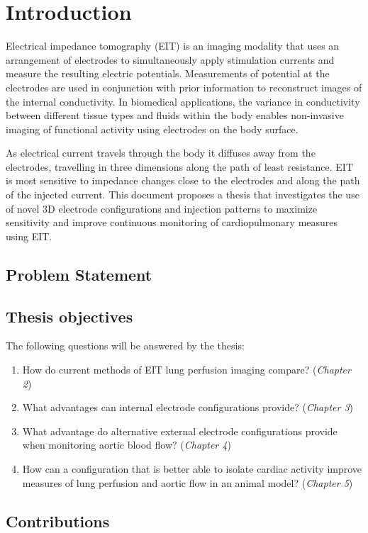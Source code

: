 \chapter{Introduction}

Electrical impedance tomography (EIT) is an imaging modality that uses an arrangement of electrodes to simultaneously apply 
stimulation currents and measure 
the resulting electric potentials. Measurements of potential at the electrodes are used in conjunction with 
prior information to reconstruct images 
of the internal conductivity. In biomedical applications, the variance in conductivity between different 
tissue types and fluids within the body enables non-invasive imaging of functional activity using electrodes on the 
body surface.

As electrical current travels through the body it diffuses away from the electrodes,
travelling in three dimensions along the path of least resistance. 
EIT is most sensitive to impedance changes close to the electrodes 
and along the path of the injected current.
This document proposes a thesis that investigates the use of novel 3D electrode 
configurations and injection patterns to maximize sensitivity and improve continuous monitoring 
of cardiopulmonary measures using EIT.

\section{Problem Statement}

\section{Thesis objectives}
The following questions will be answered by the thesis:
\begin{enumerate}
	\item How do current methods of EIT lung perfusion imaging compare? (\emph{Chapter 2})
	\item What advantages can internal electrode configurations provide? (\emph{Chapter 3})
\item What advantage do alternative external electrode configurations provide
	when monitoring aortic blood flow? (\emph{Chapter 4})
\item How can a configuration that is better able to isolate cardiac activity
	improve measures of lung perfusion and aortic flow in an animal model? (\emph{Chapter 5})
\end{enumerate}

\section{Contributions}
